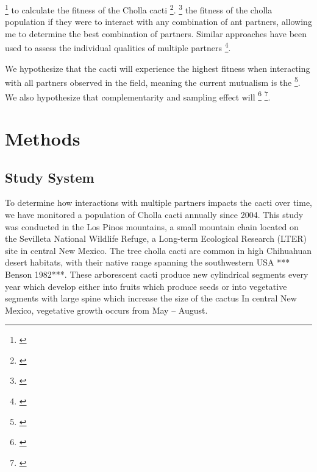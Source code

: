 \documentclass[12pt,a4paper]{article}
\newcommand{\tom}[2]{{\color{red}{#1}}\footnote{\textit{\color{red}{#2}}}}
\begin{document}
\tom{In order to answer these questions, I am constructing an Integral Projection Model (IPM)}{This is only one piece of what you are doing. I think the value of the long-term data should be better emphasized.} to calculate the fitness of the Cholla cacti \tom{under different conditions}{What conditions?}. 
\tom{I will be able to quantitatively estimate}{Use plural pronouns and don't use future tense, this is not a proposal.} the fitness of the cholla population if they were to interact with any combination of ant partners, allowing me to determine the best combination of partners. 
Similar approaches have been used to assess the individual qualities of multiple partners\cite{Palmer2010} \tom{but not to determine the optimal combination of partners in a multi-species mutualism}{The Palmer paper and perhaps others have done this. I think the novel contribution of this paper needs to be better explained.}. 

We hypothesize that the cacti will experience the highest fitness when interacting with all partners observed in the field, meaning the current mutualism is the \tom{optimal outcome}{I would avoid mention of optimality, which has an evolutionary implication that we are not addressing here}. 
We also hypothesize that complementarity and sampling effect will \tom{play roles in encouraging this}{vague - sharpen this} \tom{diverse mutualism}{A mutualism cannot be `diverse'.}. 	

\section*{Methods}
\subsection*{Study System}

To determine how interactions with multiple partners impacts the cacti over time, we have monitored a population of Cholla cacti annually since 2004. 
This study was conducted in the Los Pinos mountains, a small mountain chain located on the Sevilleta National Wildlife Refuge, a Long-term Ecological Research (LTER) site in central New Mexico. 
The tree cholla cacti are common in high Chihuahuan desert habitats, with their native range spanning the southwestern USA *** Benson 1982***. 
These arborescent cacti produce new cylindrical segments every year which develop either into fruits which produce seeds or into vegetative segments with large spine which increase the size of the cactus %
In central New Mexico, vegetative growth occurs from May -- August.
\end{document}
